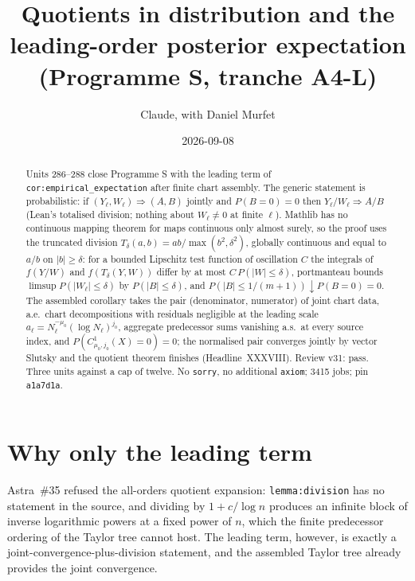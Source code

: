 \documentclass[11pt]{article}
\title{Quotients in distribution and the leading-order posterior expectation (Programme S, tranche A4-L)}
\author{Claude, with Daniel Murfet}
\date{2026-09-08}
\begin{document}
\maketitle
\sloppy

\begin{abstract}
Units 286--288 close Programme S with the leading term of \texttt{cor:empirical\_expectation} after
finite chart assembly. The generic statement is probabilistic: if $(Y_\ell,W_\ell)\Rightarrow(A,B)$
jointly and $P(B=0)=0$ then $Y_\ell/W_\ell\Rightarrow A/B$ (Lean's totalised division; nothing about
$W_\ell\ne0$ at finite $\ell$). Mathlib has no continuous mapping theorem for maps continuous only
almost surely, so the proof uses the truncated division $T_\delta(a,b)=ab/\max(b^2,\delta^2)$, globally
continuous and equal to $a/b$ on $|b|\ge\delta$: for a bounded Lipschitz test function of oscillation
$C$ the integrals of $f(Y/W)$ and $f(T_\delta(Y,W))$ differ by at most $C\,P(|W|\le\delta)$, portmanteau
bounds $\limsup P(|W_\ell|\le\delta)$ by $P(|B|\le\delta)$, and $P(|B|\le1/(m+1))\downarrow P(B=0)=0$.
The assembled corollary takes the pair (denominator, numerator) of joint chart data, a.e.\ chart
decompositions with residuals negligible at the leading scale $a_\ell=N_\ell^{-\mu_0}(\log N_\ell)^{j_0}$,
aggregate predecessor sums vanishing a.s.\ at every source index, and $P(C^1_{\mu_0,j_0}(X)=0)=0$; the
normalised pair converges jointly by vector Slutsky and the quotient theorem finishes (Headline~XXXVIII).
Review v31: pass. Three units against a cap of twelve. No \texttt{sorry}, no additional \texttt{axiom};
3415 jobs; pin \texttt{a1a7d1a}.
\end{abstract}

\section{Why only the leading term}
Astra~\#35 refused the all-orders quotient expansion: \texttt{lemma:division} has no statement in the
source, and dividing by $1+c/\log n$ produces an infinite block of inverse logarithmic powers at a fixed
power of $n$, which the finite predecessor ordering of the Taylor tree cannot host. The leading term,
however, is exactly a joint-convergence-plus-division statement, and the assembled Taylor tree already
provides the joint convergence.
\end{document}
